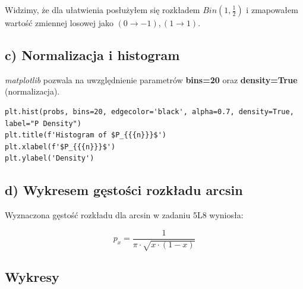 \documentclass{article}
\begin{document}
\noindent
Widzimy, że dla ułatwienia posłużyłem się rozkładem $Bin\left(1,\frac{1}{2}\right)$ i zmapowałem wartość zmiennej losowej jako $(0 \rightarrow -1), (1\rightarrow 1)$.
\subsection{c) Normalizacja i histogram}

\textit{matplotlib} pozwala na uwzględnienie parametrów \textbf{bins=20} oraz \textbf{density=True} (normalizacja).

\begin{verbatim}
plt.hist(probs, bins=20, edgecolor='black', alpha=0.7, density=True, label="P Density")
plt.title(f'Histogram of $P_{{{n}}}$')
plt.xlabel(f'$P_{{{n}}}$')
plt.ylabel('Density')
\end{verbatim}

\subsection{d) Wykresem gęstości rozkładu arcsin}

Wyznaczona gęstość rozkładu dla arcsin w zadaniu 5L8 wyniosła:

\[
p_x = \frac{1}{\pi \cdot \sqrt{x\cdot (1-x)}}
\]

\subsection{Wykresy}
\end{document}
